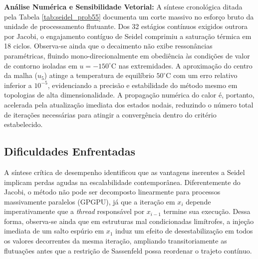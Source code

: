 \textbf{Análise Numérica e Sensibilidade Vetorial:} A síntese cronológica ditada pela Tabela \ref{tab:seidel_prob55} documenta um corte massivo no esforço bruto da unidade de processamento flutuante. Dos 32 estágios contínuos exigidos outrora por Jacobi, o engajamento contíguo de Seidel comprimiu a saturação térmica em 18 ciclos. Observa-se ainda que o decaimento não exibe ressonâncias paramétricas, fluindo mono-direcionalmente em obediência às condições de valor de contorno isoladas em $u = -150^\circ\text{C}$ nas extremidades. A aproximação do centro da malha ($u_5$) atinge a temperatura de equilíbrio $50^\circ\text{C}$ com um erro relativo inferior a $10^{-5}$, evidenciando a precisão e estabilidade do método mesmo em topologias de alta dimensionalidade. A propagação numérica do calor é, portanto, acelerada pela atualização imediata dos estados nodais, reduzindo o número total de iterações necessárias para atingir a convergência dentro do critério estabelecido.

\subsection{Dificuldades Enfrentadas}

A síntese crítica de desempenho identificou que as vantagens inerentes a Seidel implicam perdas agudas na escalabilidade contemporânea. Diferentemente do Jacobi, o método não pode ser decomposto linearmente para processos massivamente paralelos (GPGPU), já que a iteração em $x_i$ depende imperativamente que a \textit{thread} responsável por $x_{i-1}$ termine sua execução. Dessa forma, observa-se ainda que em estruturas mal condicionadas limítrofes, a injeção imediata de um salto espúrio em $x_1$ induz um efeito de desestabilização em todos os valores decorrentes da mesma iteração, ampliando transitoriamente as flutuações antes que a restrição de Sassenfeld possa reordenar o trajeto contínuo.
